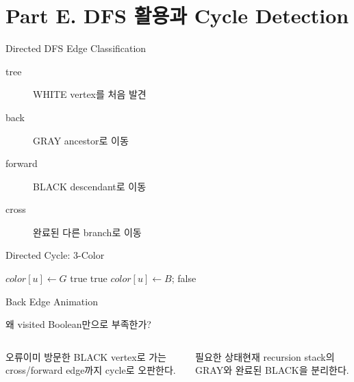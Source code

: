 \section{Part E. DFS 활용과 Cycle Detection}
\begin{frame}{Directed DFS Edge Classification}
\begin{description}\item[tree]WHITE vertex를 처음 발견\item[back]GRAY ancestor로 이동\item[forward]BLACK descendant로 이동\item[cross]완료된 다른 branch로 이동\end{description}
\end{frame}
\begin{frame}{Directed Cycle: 3-Color}
\small\begin{algorithmic}[1]
\State $color[u]\gets G$
\State \Return true\EndIf
{}\State\Return true\EndIf\EndFor
\State $color[u]\gets B$; \Return false\EndFunction
\end{algorithmic}
\end{frame}
\begin{frame}{Back Edge Animation}
\centering{}
\end{frame}
\begin{frame}{왜 visited Boolean만으로 부족한가?}
\begin{columns}[T]\begin{alertblock}{오류}이미 방문한 BLACK vertex로 가는 cross/forward edge까지 cycle로 오판한다.\end{alertblock}
\begin{block}{필요한 상태}현재 recursion stack의 GRAY와 완료된 BLACK을 분리한다.\end{block}\end{columns}
\end{frame}
